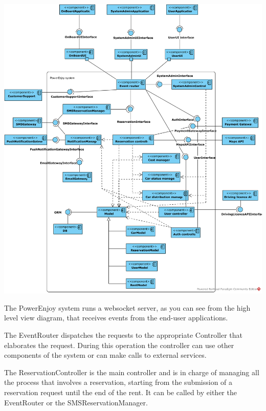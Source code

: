 \includegraphics[width=\textwidth, keepaspectratio]{../images/architectural_design/component_diagram.png}

The PowerEnjoy system runs a websocket server, as you can see from the high level view diagram, that receives events from the end-user applications.

The EventRouter dispatches the requests to the appropriate Controller that elaborates the request.
During this operation the controller can use other components of the system or can make calls to external services.

The ReservationController is the main controller and is in charge of managing all the process that involves a reservation, starting from the submission of a reservation request until the end of the rent.
It can be called by either the EventRouter or the SMSReservationManager.

